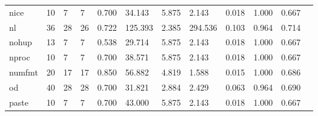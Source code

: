 \begin{longtable}{lp{1.00cm}p{1.00cm}p{1.00cm}p{1.00cm}p{1.00cm}p{1.00cm}p{1.00cm}p{1.00cm}p{1.00cm}p{1.00cm}p{1.00cm}}
nice      &                           10 &                  7 &                                 7 &                                      0.700 &                                 34.143 &                                        5.875 &                             2.143 &                                   0.018 &                        1.000 &                                        0.667 \\
nl        &                           36 &                 28 &                                26 &                                      0.722 &                                125.393 &                                        2.385 &                           294.536 &                                   0.103 &                        0.964 &                                        0.714 \\
nohup     &                           13 &                  7 &                                 7 &                                      0.538 &                                 29.714 &                                        5.875 &                             2.143 &                                   0.018 &                        1.000 &                                        0.667 \\
nproc     &                           10 &                  7 &                                 7 &                                      0.700 &                                 38.571 &                                        5.875 &                             2.143 &                                   0.018 &                        1.000 &                                        0.667 \\
numfmt    &                           20 &                 17 &                                17 &                                      0.850 &                                 56.882 &                                        4.819 &                             1.588 &                                   0.015 &                        1.000 &                                        0.686 \\
od        &                           40 &                 28 &                                28 &                                      0.700 &                                 31.821 &                                        2.884 &                             2.429 &                                   0.063 &                        0.964 &                                        0.690 \\
paste     &                           10 &                  7 &                                 7 &                                      0.700 &                                 43.000 &                                        5.875 &                             2.143 &                                   0.018 &                        1.000 &                                        0.667 \\

\end{longtable}
